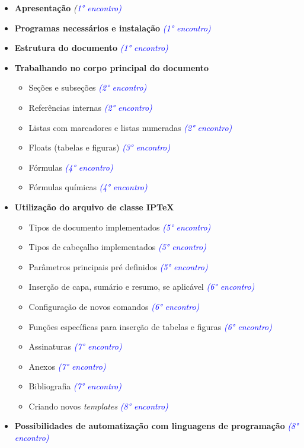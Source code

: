 \documentclass[12pt]{iptex}
\begin{document}
\begin{itemize}[itemsep=2mm]
	\item \textbf{Apresentação} \textit{(\textcolor{blue}{1° encontro)}}
	\item \textbf{Programas necessários e instalação} \textit{\textcolor{blue}{(1° encontro)}}
	\item \textbf{Estrutura do documento} \textit{\textcolor{blue}{(1° encontro)}}
	\item \textbf{Trabalhando no corpo principal do documento}
	\begin{itemize}[itemsep=2mm]
		\item Seções e subseções \textit{\textcolor{blue}{(2° encontro)}}
		\item Referências internas \textit{\textcolor{blue}{(2° encontro)}}
		\item Listas com marcadores e listas numeradas \textit{\textcolor{blue}{(2° encontro)}}
		\item Floats (tabelas e figuras) \textit{\textcolor{blue}{(3° encontro)}}
		\item Fórmulas \textit{\textcolor{blue}{(4° encontro)}}
		\item Fórmulas químicas \textit{\textcolor{blue}{(4° encontro)}}
	\end{itemize}
	\item \textbf{Utilização do arquivo de classe IPTeX}
	\begin{itemize}[itemsep=2mm]
		\item Tipos de documento implementados \textit{\textcolor{blue}{(5° encontro)}}
		\item Tipos de cabeçalho implementados \textit{\textcolor{blue}{(5° encontro)}}
		\item Parâmetros principais pré definidos \textit{\textcolor{blue}{(5° encontro)}}
		\item Inserção de capa, sumário e resumo, se aplicável \textit{\textcolor{blue}{(6° encontro)}}
		\item Configuração de novos comandos \textit{\textcolor{blue}{(6° encontro)}}
		\item Funções específicas para inserção de tabelas e figuras \textit{\textcolor{blue}{(6° encontro)}}
		\item Assinaturas \textit{\textcolor{blue}{(7° encontro)}}
		\item Anexos \textit{\textcolor{blue}{(7° encontro)}}
		\item Bibliografia \textit{\textcolor{blue}{(7° encontro)}}
		\item Criando novos \textit{templates} \textit{\textcolor{blue}{(8° encontro)}}
	\end{itemize}
	\item \textbf{Possibilidades de automatização com linguagens de programação} \textit{\textcolor{blue}{(8° encontro)}}
\end{itemize}
\end{document}
